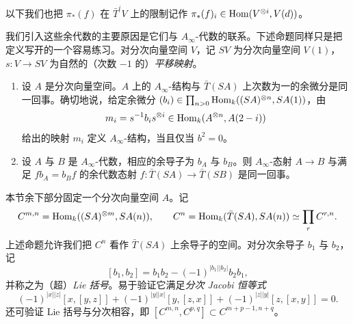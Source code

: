
以下我们也把 $\pi_*(f)$ 在 $\bar T^iV$ 上的限制记作 $\pi_*(f)_i\in\operatorname{Hom}(V^{\otimes i},V(d))$。

我们引入这些余代数的主要原因是它们与 $A_\infty$-代数的联系。下述命题同样只是把定义写开的一个容易练习。对分次向量空间 $V$，记 $SV$ 为分次向量空间 $V(1)$，$s:V\to SV$ 为自然的（次数 $-1$ 的）\emph{平移映射}。

\begin{proposition}\label{prop:5.2}
\begin{enumerate}
  \item 设 $A$ 是分次向量空间。$A$ 上的 $A_\infty$-结构与 $\bar T(SA)$ 上次数为一的余微分是同一回事。确切地说，给定余微分 $(b_i)\in\prod_{n>0}\operatorname{Hom}_k((SA)^{\otimes n},SA(1))$，由
  \[
  m_i=s^{-1}b_is^{\otimes i}\in\operatorname{Hom}_k(A^{\otimes n},A(2-i))
  \]
  给出的映射 $m_i$ 定义 $A_\infty$-结构，当且仅当 $b^2=0$。
  \item 设 $A$ 与 $B$ 是 $A_\infty$-代数，相应的余导子为 $b_A$ 与 $b_B$。则 $A_\infty$-态射 $A\to B$ 与满足 $fb_A=b_Bf$ 的余代数态射 $f:\bar T(SA)\to\bar T(SB)$ 是同一回事。
\end{enumerate}
\end{proposition}



本节余下部分固定一个分次向量空间 $A$。记
\[
C^{m,n}=\operatorname{Hom}_k((SA)^{\otimes m},SA(n)),\qquad C^n=\operatorname{Hom}_k(\bar T(SA),SA(n))\simeq\prod_r C^{r,n}.
\]
上述命题允许我们把 $C^n$ 看作 $\bar T(SA)$ 上余导子的空间。对分次余导子 $b_1$ 与 $b_2$，记
\[
[b_1,b_2]=b_1b_2-(-1)^{|b_1||b_2|}b_2b_1,
\]
并称之为（超）\emph{Lie 括号}。易于验证它满足\emph{分次 Jacobi 恒等式}
\begin{equation}\label{eq:hoch-jacobi}
(-1)^{|x||z|}[x,[y,z]]+(-1)^{|y||x|}[y,[z,x]]+(-1)^{|z||y|}[z,[x,y]]=0 .
\end{equation}
还可验证 Lie 括号与分次相容，即 $[C^{m,n},C^{p,q}]\subset C^{m+p-1,n+q}$。

